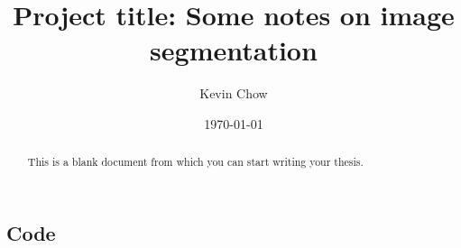 \documentclass[undefended]{sfuthesis}
\title{Project title: Some notes on image segmentation}
\author{Kevin Chow}
\date{\today}
\begin{document}
\maketitle{}

\begin{abstract}
	This is a blank document from which you can start writing your thesis.
\end{abstract}





%
\tableofcontents%
\clearpage

%





%
%

\mainmatter%








%
%
%
%
%

\backmatter%
	

\begin{appendices} %
	\chapter{Code}
\end{appendices}
\end{document}
